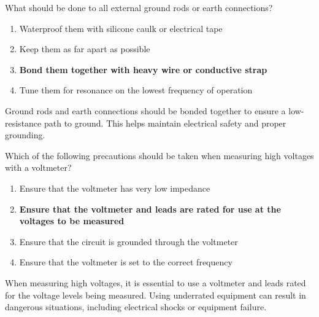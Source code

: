 \begin{tcolorbox}[colback=gray!10!white,colframe=black!75!black,title={T0A09}]
    What should be done to all external ground rods or earth connections?
    \begin{enumerate}[label=\Alph*),noitemsep]
        \item Waterproof them with silicone caulk or electrical tape
        \item Keep them as far apart as possible
        \item \textbf{Bond them together with heavy wire or conductive strap}
        \item Tune them for resonance on the lowest frequency of operation
    \end{enumerate}
\end{tcolorbox}
Ground rods and earth connections should be bonded together to ensure a low-resistance path to ground. This helps maintain electrical safety and proper grounding.

\begin{tcolorbox}[colback=gray!10!white,colframe=black!75!black,title={T0A12}]
    Which of the following precautions should be taken when measuring high voltages with a voltmeter?
    \begin{enumerate}[label=\Alph*),noitemsep]
        \item Ensure that the voltmeter has very low impedance
        \item \textbf{Ensure that the voltmeter and leads are rated for use at the voltages to be measured}
        \item Ensure that the circuit is grounded through the voltmeter
        \item Ensure that the voltmeter is set to the correct frequency
    \end{enumerate}
\end{tcolorbox}
When measuring high voltages, it is essential to use a voltmeter and leads rated for the voltage levels being measured. Using underrated equipment can result in dangerous situations, including electrical shocks or equipment failure.
